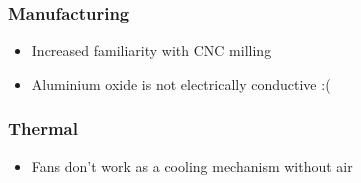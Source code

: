 \begin{comment}
\subsubsection{Mechanical }

\begin{itemize}
    \item Friendship
    \item Sleep deprivation
\end{itemize}
 \end{comment}
 
 \subsubsection{Manufacturing}
 
 \begin{itemize}
 	\item Increased familiarity with CNC milling
 	\item Aluminium oxide is not electrically conductive :(
 \end{itemize}

\subsubsection{Thermal }
\begin{itemize}
    \item Fans don't work as a cooling mechanism without air
\end{itemize}
